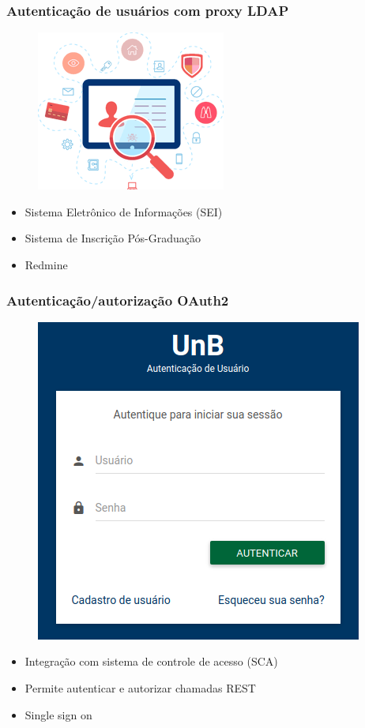 \documentclass{beamer}
\begin{document}
\begin{frame}
  \frametitle{Autenticação de usuários com proxy LDAP}

	\begin{figure}
	\centering
		\includegraphics[scale=0.3]{img/ldap.png}
	\end{figure}


	  \begin{itemize}
		\item<1->Sistema Eletrônico de Informações (SEI)
	    \item<1->Sistema de Inscrição Pós-Graduação
	    \item<1->Redmine
	  \end{itemize}
  
\end{frame}


\begin{frame}
  \frametitle{Autenticação/autorização OAuth2}

	\begin{figure}
	\centering
		\includegraphics[scale=0.2]{img/oauth2.png}
	\end{figure}

	  \begin{itemize}
		\item<1->Integração com sistema de controle de acesso (SCA)
	    \item<1->Permite autenticar e autorizar chamadas REST
	    \item<1->Single sign on
	  \end{itemize}
  
\end{frame}
\end{document}
